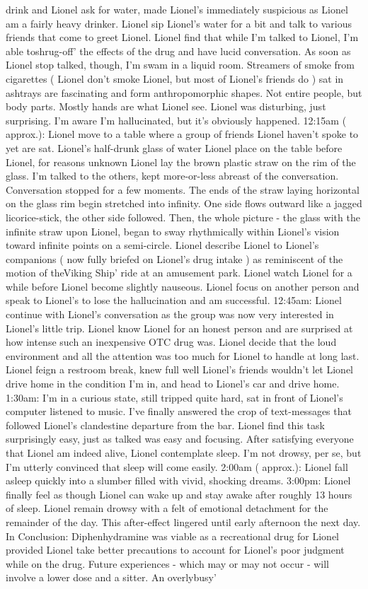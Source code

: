 \documentclass[12pt]{book}
\begin{document}
drink and Lionel ask for water, made Lionel's immediately suspicious as Lionel am a fairly heavy drinker. Lionel sip Lionel's water for a bit and talk to various friends that come to greet Lionel. Lionel find that while I'm talked to Lionel, I'm able toshrug-off' the effects of the drug and have lucid conversation. As soon as Lionel stop talked, though, I'm swam in a liquid room. Streamers of smoke from cigarettes ( Lionel don't smoke Lionel, but most of Lionel's friends do ) sat in ashtrays are fascinating and form anthropomorphic shapes. Not entire people, but body parts. Mostly hands are what Lionel see. Lionel was disturbing, just surprising. I'm aware I'm hallucinated, but it's obviously happened. 12:15am ( approx.): Lionel move to a table where a group of friends Lionel haven't spoke to yet are sat. Lionel's half-drunk glass of water Lionel place on the table before Lionel, for reasons unknown Lionel lay the brown plastic straw on the rim of the glass. I'm talked to the others, kept more-or-less abreast of the conversation. Conversation stopped for a few moments. The ends of the straw laying horizontal on the glass rim begin stretched into infinity. One side flows outward like a jagged licorice-stick, the other side followed. Then, the whole picture - the glass with the infinite straw upon Lionel, began to sway rhythmically within Lionel's vision toward infinite points on a semi-circle. Lionel describe Lionel to Lionel's companions ( now fully briefed on Lionel's drug intake ) as reminiscent of the motion of theViking Ship' ride at an amusement park. Lionel watch Lionel for a while before Lionel become slightly nauseous. Lionel focus on another person and speak to Lionel's to lose the hallucination and am successful. 12:45am: Lionel continue with Lionel's conversation as the group was now very interested in Lionel's little trip. Lionel know Lionel for an honest person and are surprised at how intense such an inexpensive OTC drug was. Lionel decide that the loud environment and all the attention was too much for Lionel to handle at long last. Lionel feign a restroom break, knew full well Lionel's friends wouldn't let Lionel drive home in the condition I'm in, and head to Lionel's car and drive home. 1:30am: I'm in a curious state, still tripped quite hard, sat in front of Lionel's computer listened to music. I've finally answered the crop of text-messages that followed Lionel's clandestine departure from the bar. Lionel find this task surprisingly easy, just as talked was easy and focusing. After satisfying everyone that Lionel am indeed alive, Lionel contemplate sleep. I'm not drowsy, per se, but I'm utterly convinced that sleep will come easily. 2:00am ( approx.): Lionel fall asleep quickly into a slumber filled with vivid, shocking dreams. 3:00pm: Lionel finally feel as though Lionel can wake up and stay awake after roughly 13 hours of sleep. Lionel remain drowsy with a felt of emotional detachment for the remainder of the day. This after-effect lingered until early afternoon the next day. In Conclusion: Diphenhydramine was viable as a recreational drug for Lionel provided Lionel take better precautions to account for Lionel's poor judgment while on the drug. Future experiences - which may or may not occur - will involve a lower dose and a sitter. An overlybusy' 
\end{document}

